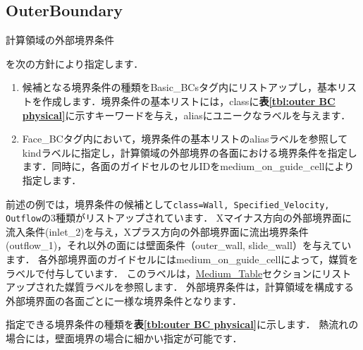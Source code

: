 %
\subsection{OuterBoundary}

\hypertarget{tgt:outer_boundary}{計算領域の外部境界条件}を次の方針により指定します．

\begin{enumerate}
\item 候補となる境界条件の種類をBasic\_BCsタグ内にリストアップし，基本リストを作成します．境界条件の基本リストには，classに\textbf{表\ref{tbl:outer BC physical}}に示すキーワードを与え，aliasにユニークなラベルを与えます．
\item Face\_BCタグ内において，境界条件の基本リストのaliasラベルを参照してkindラベルに指定し，計算領域の外部境界の各面における境界条件を指定します．同時に，各面のガイドセルのセルIDをmedium\_on\_guide\_cellにより指定します．
\end{enumerate}

前述の例では，境界条件の候補として\verb|class=Wall, Specified_Velocity, Outflow|の3種類がリストアップされています．
Xマイナス方向の外部境界面に流入条件(inlet\_2)を与え，Xプラス方向の外部境界面に流出境界条件(outflow\_1)，それ以外の面には壁面条件（outer\_wall, slide\_wall）を与えています．
各外部境界面のガイドセルにはmedium\_on\_guide\_cellによって，媒質をラベルで付与しています．
このラベルは，\hyperlink{tgt:medium_table}{Medium\_Table}セクションにリストアップされた媒質ラベルを参照します．
外部境界条件は，計算領域を構成する外部境界面の各面ごとに一様な境界条件となります．

指定できる境界条件の種類を\textbf{表\ref{tbl:outer BC physical}}に示します．
熱流れの場合には，壁面境界の場合に細かい指定が可能です．

